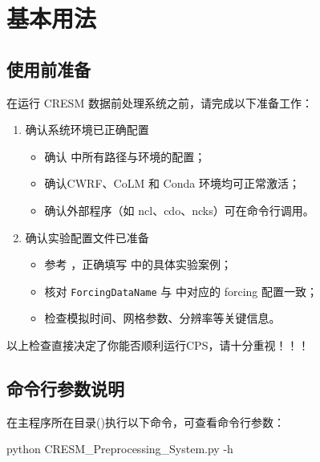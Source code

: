 \documentclass[UTF8,a4paper,11pt,fontset=none]{ctexart}
\begin{document}
\newpage

\section{基本用法}

\subsection{使用前准备}

在运行 CRESM 数据前处理系统之前，请完成以下准备工作：

\begin{enumerate}
    \item 确认系统环境已正确配置
    \begin{itemize}
        \item 确认  中所有路径与环境的配置；
        \item 确认CWRF、CoLM 和 Conda 环境均可正常激活；
        \item 确认外部程序（如 ncl、cdo、ncks）可在命令行调用。
    \end{itemize}

    \item 确认实验配置文件已准备
    \begin{itemize}
        \item 参考 ，正确填写  中的具体实验案例；
        \item 核对 \texttt{ForcingDataName} 与  中对应的 forcing 配置一致；
        \item 检查模拟时间、网格参数、分辨率等关键信息。
    \end{itemize}
\end{enumerate}

\begin{CPSEmphasis}[！请重视！]
    以上检查直接决定了你能否顺利运行CPS，请十分重视！！！
\end{CPSEmphasis}


\subsection{命令行参数说明}

在主程序所在目录()执行以下命令，可查看命令行参数：

\begin{CPSCode} [leftmargin=2em,commandchars=\\\{\}]
    python CRESM_Preprocessing_System.py -h
\end{CPSCode}
\end{document}

